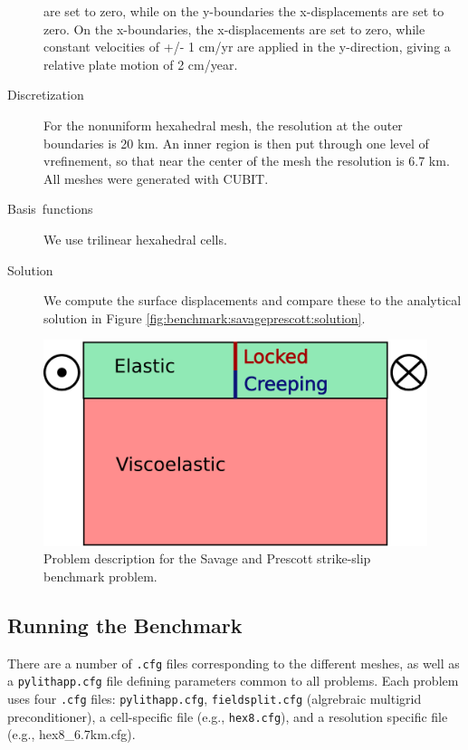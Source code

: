 \begin{description}
are set to zero, while on the y-boundaries the x-displacements are
set to zero. On the x-boundaries, the x-displacements are set to zero,
while constant velocities of +/- 1 cm/yr are applied in the y-direction,
giving a relative plate motion of 2 cm/year.
\item [Discretization] For the nonuniform hexahedral mesh, the resolution
at the outer boundaries is 20 km. An inner region is then put through
one level of vrefinement, so that near the center of the mesh the resolution
is 6.7 km. All meshes were generated with CUBIT.
\item [Basis~functions] We use trilinear hexahedral cells.
\item [Solution] We compute the surface displacements and compare these
to the analytical solution in Figure \vref{fig:benchmark:savageprescott:solution}.
\end{description}

\begin{figure}[htbp]
  \includegraphics[scale=0.33]{benchmarks/figs/savageprescott_diagram}
  \caption{Problem description for the Savage and Prescott strike-slip
    benchmark problem.}
  \label{fig:benchmark:savageprescott:geometry}
\end{figure}


\subsection{Running the Benchmark}

There are a number of {\tt .cfg} files corresponding to the
different meshes, as well as a {\tt pylithapp.cfg} file defining
parameters common to all problems. Each problem uses four
{\tt .cfg} files: {\tt pylithapp.cfg}, {\tt fieldsplit.cfg}
(algrebraic multigrid preconditioner), a cell-specific file (e.g.,
{\tt hex8.cfg}), and a resolution specific file (e.g.,
hex8\_6.7km.cfg).

